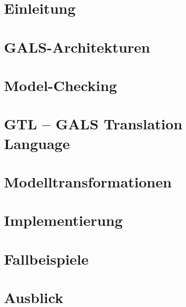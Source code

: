 \documentclass[
  10pt,
  a4paper,
  twoside,
  titlepage,
  headings=normal,
  bibliography=totoc]{scrbook}
\begin{document}
\tableofcontents

\chapter{Einleitung}

\chapter{GALS-Architekturen}

\chapter{Model-Checking}


\chapter{GTL -- GALS Translation Language}

\chapter{Modelltransformationen}




\chapter{Implementierung}








\chapter{Fallbeispiele}

\chapter{Ausblick}


\begin{appendix}
  
  
\end{appendix}
\end{document}
